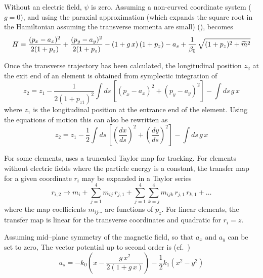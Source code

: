 \label{paraxial approximation} Without an electric field, $\psi$ is zero. Assuming a
non-curved coordinate system ($g = 0$), and using the paraxial approximation (which
expands the square root in the Hamiltonian assuming the transverse momenta are small)
(),  becomes
\begin{equation}
  H = \frac{(p_x - a_x)^2}{2 (1 + p_z)} + \frac{(p_y - a_y)^2}{2 (1 + p_z)} - 
  (1 + g \, x) \, (1 + p_z) - a_s +   \frac{1}{\beta_0} \, \sqrt{(1+p_z)^2 + \widetilde m^2}
  \label{hpapa}
\end{equation}

Once the transverse trajectory has been calculated, the longitudinal position
$z_2$ at the exit end of an element is obtained from symplectic
integration of 
\begin{equation}
  z_2 = z_1 - \frac{1}{2 (1 + p_{z1})^2} \int \! ds \, 
  \left[ (p_x - a_x)^2 + (p_y - a_y)^2 \right] - \int \! ds \, g \, x
  \label{zz121p}
\end{equation}
where $z_1$ is the longitudinal position at the entrance end of the element.
Using the equations of motion  this can also be rewritten as
\begin{equation}
  z_2 = z_1 - \frac{1}{2} \int \! ds \, 
  \left[ \left( \frac{dx}{ds} \right)^2 + \left( \frac{dy}{ds} \right)^2 \right] - 
  \int \! ds \, g \, x
  \label{zz12sx}
\end{equation}

For some elements,  uses a truncated Taylor map for
tracking.  For elements without electric fields where the particle
energy is a constant, the transfer map for a given coordinate $r_i$
may be expanded in a Taylor series
\begin{equation}
  r_{i,2} \rightarrow m_i + \sum_{j = 1}^4 m_{ij} \, r_{j,1} + 
  \sum_{j = 1}^4 \sum_{k = j}^4 m_{ijk} \, r_{j,1} \, r_{k,1} + \ldots
\end{equation}
where the map coefficients $m_{ij\cdots}$ are functions of $p_z$.  For
linear elements, the transfer map is linear for the transverse
coordinates and quadratic for $r_i = z$.

Assuming mid--plane symmetry of the magnetic field, so
that $a_x$ and $a_y$ can be set to zero\cite{b:madphysics}, The vector
potential up to second order is (cf.~)
\begin{equation}
  a_s = -k_0 \left( x - \frac{g \, x^2}{2 (1 + g\, x)} \right) -
  \frac{1}{2} k_1 \left( x^2 - y^2 \right)
  \label{akxgx}
\end{equation}


